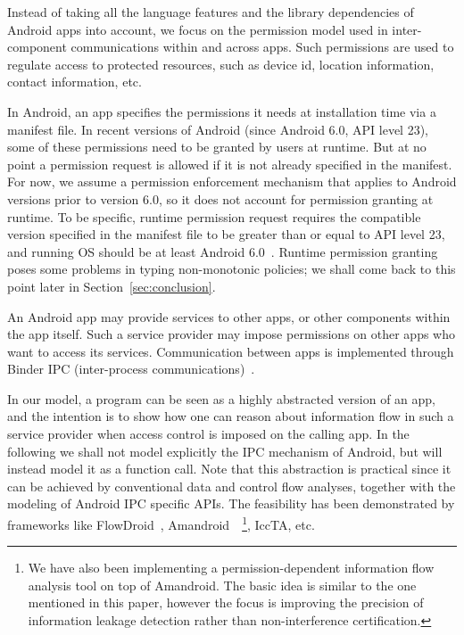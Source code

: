 Instead of taking all the language features and the library dependencies of Android apps into account, we focus on the permission model used in inter-component communications within and across apps. Such permissions are used to regulate access to protected resources, such as device id, location information, contact information, etc.

In Android, an app specifies the permissions it needs at installation time via a manifest file. In recent versions of Android (since Android 6.0, API level 23), some of these permissions need to be granted by users at runtime. But
at no point a permission request is allowed if it is not already specified in the manifest.
For now, we assume a permission enforcement mechanism that applies to Android versions prior to version 6.0, so it does not
account for permission granting at runtime. To be specific, runtime permission request requires the compatible version specified in the manifest file to be greater than or equal to API level 23, and running OS should be at least Android 6.0~\cite{url:android-perm}. Runtime permission granting poses some problems in typing non-monotonic
policies; we shall come back to this point later in Section~\ref{sec:conclusion}.

An Android app may provide services to other apps,
or other components within the app itself. Such a service provider
may impose permissions on other apps who want to
access its services. Communication between apps is implemented
through Binder IPC (inter-process communications)~\cite{Android-Binder-IPC}.

In our model, a program can be seen as a highly abstracted version of an app, and the intention is to show how one can reason about information flow in such a service provider when access control is imposed on the calling app. In the following we shall not model explicitly the IPC mechanism of Android, but will instead model it as a function call. Note that this abstraction is practical since it can be achieved by conventional data and control flow analyses, together with the modeling of Android IPC specific APIs. The feasibility has been demonstrated by frameworks like FlowDroid~\cite{Arzt:2014:FPC:2666356.2594299}, Amandroid~\cite{Wei:2014:APG:2660267.2660357}~\footnote{We have also been implementing a permission-dependent information flow analysis tool on top of Amandroid. The basic idea is similar to the one mentioned in this paper, however the focus is improving the precision of information leakage detection rather than non-interference certification.}, IccTA\cite{Li:2015:IDI:2818754.2818791}, etc.

